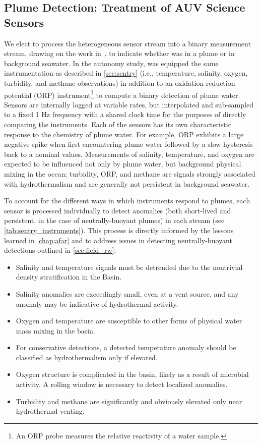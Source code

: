 \subsection{Plume Detection: Treatment of AUV \Sentry Science Sensors}
\label{sec:field_sensor_models}
We elect to process the heterogeneous sensor stream into a binary measurement stream, drawing on the work in~\cite{jakuba2007stochastic}, to indicate whether \Sentry was in a plume or in background seawater. In the autonomy study, \Sentry was equipped the same instrumentation as described in \cref{sec:sentry} (i.e., temperature, salinity, oxygen, turbidity, and methane observations) in addition to an oxidation reduction potential (ORP) instrument\footnote{An ORP probe measures the relative reactivity of a water sample.} to compute a binary detection of plume water. Sensors are internally logged at variable rates, but interpolated and sub-sampled to a fixed 1 Hz frequency with a shared clock time for the purposes of directly comparing the instruments. Each of the sensors has its own characteristic response to the chemistry of plume water. For example, ORP exhibits a large negative spike when first encountering plume water followed by a slow hysteresis back to a nominal values. Measurements of salinity, temperature, and oxygen are expected to be influenced not only by plume water, but background physical mixing in the ocean\autocite{li2020increasing,speer1989model,preston2022physically}; turbidity, ORP, and methane are signals strongly associated with hydrothermalism and are generally not persistent in background seawater.

To account for the different ways in which instruments respond to plumes, each sensor is processed individually to detect anomalies (both short-lived and persistent, in the case of neutrally-buoyant plumes) in each stream (see \cref{tab:sentry_instruments}). This process is directly informed by the lessons learned in \cref{chap:afar} and to address issues in detecting neutrally-buoyant detections outlined in \cref{sec:field_rw}:
\begin{itemize}
    \item Salinity and temperature signals must be detrended due to the nontrivial density stratification in the Basin.
    \item Salinity anomalies are exceedingly small, even at a vent source, and any anomaly may be indicative of hydrothermal activity.
    \item Oxygen and temperature are susceptible to other forms of physical water mass mixing in the basin.
    \item For conservative detections, a detected temperature anomaly should be classified as hydrothermalism only if elevated.
    \item Oxygen structure is complicated in the basin, likely as a result of microbial activity. A rolling window is necessary to detect localized anomalies.
    \item Turbidity and methane are significantly and obviously elevated only near hydrothermal venting.    
\end{itemize}

